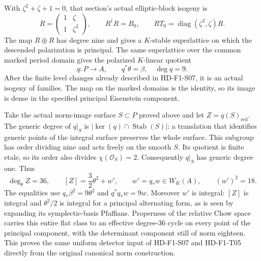 With $\zeta^2+\zeta+1=0$, that section's actual
elliptic-block isogeny is
\[
 R=\begin{pmatrix}1&\zeta\\1&\zeta^2\end{pmatrix},\qquad
 R^\dagger R=B_0,\qquad
 RT_0=\operatorname{diag}(\zeta^2,\zeta)R.
\]
The map $R\oplus R$ has degree nine and gives a
$K$-stable superlattice on which the descended
polarization is principal. The same superlattice
over the common marked period domain gives the
polarized $K$-linear quotient
\[
                   q:P\longrightarrow A,\qquad q^*\theta=\beta,
                   \quad\deg q=9.
\]
After the finite level changes already described in
HD-F1-S07, it is an actual isogeny of families.
The map on the marked domains is the identity,
so its image is dense in the specified principal
Eisenstein component.

Take the actual norm-image surface $S\subset P$
proved above and let $Z=q(S)_{\mathrm{red}}$.
The generic degree of $q|_S$ is
$|\ker(q)\cap\operatorname{Stab}(S)|$: a translation
that identifies generic points of the integral
surface preserves the whole surface. This subgroup
has order dividing nine and acts freely on the
smooth $S$. Its quotient is finite etale, so its
order also divides $\chi(\mathcal O_S)=2$.
Consequently $q|_S$ has generic degree one. Thus
\[
 \deg_\theta Z=36,\qquad
 [Z]=\frac32\theta^2+w',\qquad
 w'=q_*w\in W_K(A),\qquad (w')^2=18.
 \tag{F1S10.20}
\]
The equalities use $q_*\beta^2=9\theta^2$ and
$q^*q_*w=9w$. Moreover $w'$ is integral:
$[Z]$ is integral and $\theta^2/2$ is integral
for a principal alternating form, as is seen
by expanding its symplectic-basis Pfaffians.
Properness of the relative Chow space carries
this entire flat class to an effective degree-36
cycle on every point of the principal component,
with the determinant component still of norm
eighteen. This proves the same uniform detector
input of HD-F1-S07 and HD-F1-T05 directly from
the original canonical norm construction.

